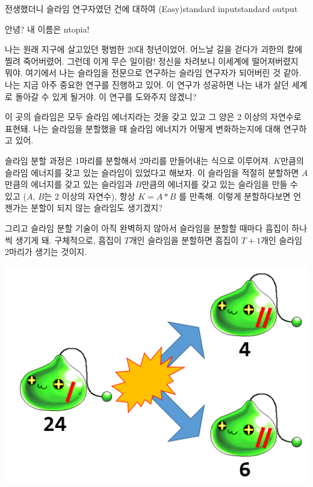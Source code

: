 \begin{problem}{전생했더니 슬라임 연구자였던 건에 대하여 (Easy)}{standard input}{standard output}

안녕? 내 이름은 ntopia!

나는 원래 지구에 살고있던 평범한 20대 청년이었어. 어느날 길을 걷다가 괴한의 칼에 찔려
죽어버렸어. 그런데 이게 무슨 일이람! 정신을 차려보니 이세계에 떨어져버렸지 뭐야.
여기에서 나는 슬라임을 전문으로 연구하는 슬라임 연구자가 되어버린 것 같아.
나는 지금 아주 중요한 연구를 진행하고 있어. 이 연구가 성공하면 나는 내가 살던 세계로
돌아갈 수 있게 될거야. 이 연구를 도와주지 않겠니?

이 곳의 슬라임은 모두 슬라임 에너지라는 것을 갖고 있고 그 양은 2 이상의 자연수로 표현돼.
나는 슬라임을 분할했을 때 슬라임 에너지가 어떻게 변화하는지에 대해 연구하고 있어.

슬라임 분할 과정은 1마리를 분할해서 2마리를 만들어내는 식으로 이루어져.
$K$만큼의 슬라임 에너지를 갖고 있는 슬라임이 있었다고 해보자. 이 슬라임을 적절히 분할하면
$A$만큼의 에너지를 갖고 있는 슬라임과
$B$만큼의 에너지를 갖고 있는 슬라임을 만들 수 있고 ($A$, $B$는 2 이상의 자연수),
항상 $K = A * B$ 를 만족해.
이렇게 분할하다보면 언젠가는 분할이 되지 않는 슬라임도 생기겠지?

그리고 슬라임 분할 기술이 아직 완벽하지 않아서 슬라임을 분할할 때마다
흠집이 하나씩 생기게 돼. 구체적으로, 흠집이 $T$개인 슬라임을 분할하면
흠집이 $T+1$개인 슬라임 2마리가 생기는 것이지.

\begin{center}
  \includegraphics[width=1\textwidth]{slime_divide.png}
\end{center}


\end{problem}
